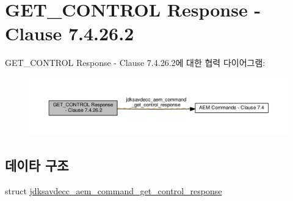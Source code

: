 \hypertarget{group__command__get__control__response}{}\section{G\+E\+T\+\_\+\+C\+O\+N\+T\+R\+OL Response -\/ Clause 7.4.26.2}
\label{group__command__get__control__response}
G\+E\+T\+\_\+\+C\+O\+N\+T\+R\+OL Response -\/ Clause 7.4.26.2에 대한 협력 다이어그램\+:
\nopagebreak
\begin{figure}[H]
\begin{center}
\leavevmode
\includegraphics[width=350pt]{group__command__get__control__response}
\end{center}
\end{figure}
\subsection*{데이타 구조}
\begin{DoxyCompactItemize}
\item 
struct \hyperlink{structjdksavdecc__aem__command__get__control__response}{jdksavdecc\+\_\+aem\+\_\+command\+\_\+get\+\_\+control\+\_\+response}
\end{DoxyCompactItemize}
